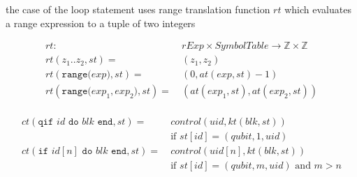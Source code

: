 the case of the loop statement uses range translation function $rt$ which evaluates a range expression to a tuple of two integers 

\begin{align*}
    rt : \ & rExp \times SymbolTable \to \mathbb{Z} \times \mathbb{Z}\\
    rt(z_1 .. z_2, st)  = \ & (z_1, z_2)\\
    rt(\texttt{range(} exp \texttt{)}, st) = \ & (0, at(exp, st) - 1)\\
    rt(\texttt{range(} exp_1, exp_2 \texttt{)}, st) = \ & (at(exp_1, st), at(exp_2, st))\\
\end{align*}

\begin{align*}
        ct(\texttt{qif } id \texttt{ do } blk \texttt{ end}, st) = \ 
            &  control(uid, kt(blk, st)) \\
            & \text{if } st[id] = (qubit, 1, uid)\\
        ct(\texttt{if } id[n] \texttt{ do } blk \texttt{ end}, st) = \ 
            &  control(uid[n], kt(blk, st)) \\
            & \text{if } st[id] = (qubit, m, uid) \text{ and } m > n
\end{align*}

